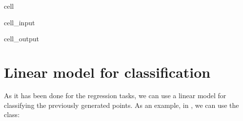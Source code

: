 \documentclass[letterpaper,10pt,english]{jupyterBook}
\begin{document}
\begin{sphinxuseclass}{cell}
\begin{sphinxVerbatimInput}
\begin{sphinxuseclass}{cell_input}
\begin{sphinxVerbatim}[commandchars=\\\{\}]
   

   
\end{sphinxVerbatim}

\end{sphinxuseclass}\end{sphinxVerbatimInput}
\begin{sphinxVerbatimOutput}

\begin{sphinxuseclass}{cell_output}
\noindent{}

\end{sphinxuseclass}\end{sphinxVerbatimOutput}

\end{sphinxuseclass}

\section{Linear model for classification}
\label{\detokenize{06:linear-model-for-classification}}
\sphinxAtStartPar
As it has been done for the regression tasks, we can use a linear model for classifying the previously generated points. As an example, in , we can use the  class:
\end{document}
